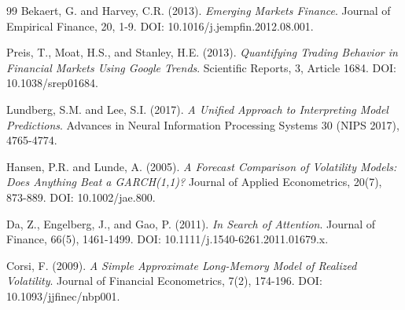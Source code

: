 \documentclass[12pt,a4paper]{article}
\begin{document}
\begin{thebibliography}{99}
Bekaert, G. and Harvey, C.R. (2013).
\textit{Emerging Markets Finance}.
Journal of Empirical Finance, 20, 1-9.
DOI: 10.1016/j.jempfin.2012.08.001.

Preis, T., Moat, H.S., and Stanley, H.E. (2013).
\textit{Quantifying Trading Behavior in Financial Markets Using Google Trends}.
Scientific Reports, 3, Article 1684.
DOI: 10.1038/srep01684.

Lundberg, S.M. and Lee, S.I. (2017).
\textit{A Unified Approach to Interpreting Model Predictions}.
Advances in Neural Information Processing Systems 30 (NIPS 2017), 4765-4774.

Hansen, P.R. and Lunde, A. (2005).
\textit{A Forecast Comparison of Volatility Models: Does Anything Beat a GARCH(1,1)?}
Journal of Applied Econometrics, 20(7), 873-889.
DOI: 10.1002/jae.800.

Da, Z., Engelberg, J., and Gao, P. (2011).
\textit{In Search of Attention}.
Journal of Finance, 66(5), 1461-1499.
DOI: 10.1111/j.1540-6261.2011.01679.x.

Corsi, F. (2009).
\textit{A Simple Approximate Long-Memory Model of Realized Volatility}.
Journal of Financial Econometrics, 7(2), 174-196.
DOI: 10.1093/jjfinec/nbp001.

\end{thebibliography}
\end{document}
